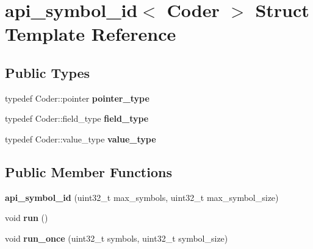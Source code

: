 \hypertarget{structapi__symbol__id}{\section{api\-\_\-symbol\-\_\-id$<$ Coder $>$ Struct Template Reference}
\label{structapi__symbol__id}
}
\subsection*{Public Types}
\begin{DoxyCompactItemize}
\item 
\hypertarget{structapi__symbol__id_a54069d38152028f663643af4a46d0271}{typedef Coder\-::pointer {\bfseries pointer\-\_\-type}}\label{structapi__symbol__id_a54069d38152028f663643af4a46d0271}

\item 
\hypertarget{structapi__symbol__id_a51d6e3c5e15c960dd71dfb3e26c3ea9a}{typedef Coder\-::field\-\_\-type {\bfseries field\-\_\-type}}\label{structapi__symbol__id_a51d6e3c5e15c960dd71dfb3e26c3ea9a}

\item 
\hypertarget{structapi__symbol__id_a392593a6a8eb76c825535b2dcdd72108}{typedef Coder\-::value\-\_\-type {\bfseries value\-\_\-type}}\label{structapi__symbol__id_a392593a6a8eb76c825535b2dcdd72108}

\end{DoxyCompactItemize}
\subsection*{Public Member Functions}
\begin{DoxyCompactItemize}
\item 
\hypertarget{structapi__symbol__id_a6dc4fd294171e1883f5626a783f315ab}{{\bfseries api\-\_\-symbol\-\_\-id} (uint32\-\_\-t max\-\_\-symbols, uint32\-\_\-t max\-\_\-symbol\-\_\-size)}\label{structapi__symbol__id_a6dc4fd294171e1883f5626a783f315ab}

\item 
\hypertarget{structapi__symbol__id_a42945fedb251647e691557f760fde7af}{void {\bfseries run} ()}\label{structapi__symbol__id_a42945fedb251647e691557f760fde7af}

\item 
\hypertarget{structapi__symbol__id_a5537ae0d377467209326f54803257857}{void {\bfseries run\-\_\-once} (uint32\-\_\-t symbols, uint32\-\_\-t symbol\-\_\-size)}\label{structapi__symbol__id_a5537ae0d377467209326f54803257857}

\end{DoxyCompactItemize}
